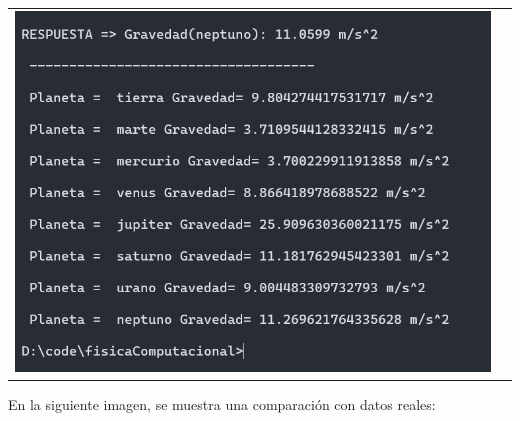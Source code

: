 \documentclass[a4paper,12pt]{article}
\begin{document}
\begin{table}[!htbp]
\begin{tabular}{cc}
\begin{minipage}{.3\textwidth}
                    \includegraphics[width=\linewidth]{e1_4}
                \end{minipage}
            \end{tabular}
        \end{table}

        En la siguiente imagen, se muestra una comparación con datos reales:
        
\end{document}

